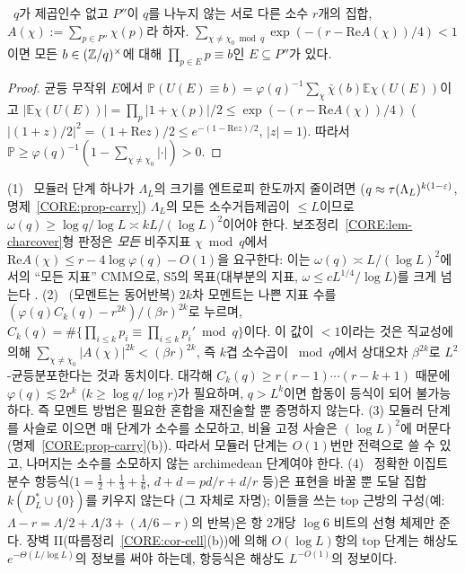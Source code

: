 \begin{lemma}\label{CORE:lem-charcover}
\PROVED\ $q$가 제곱인수 없고 $P''$이 $q$를 나누지 않는 서로 다른 소수 $r$개의 집합, $A(\chi):=\sum_{p\in P''}\chi(p)$라 하자. $\sum_{\chi\ne\chi_0\bmod q}\exp(-(r-\mathrm{Re}A(\chi))/4)<1$이면 모든 $b\in(\mathbb{Z}/q)^\times$에 대해 $\prod_{p\in E}p\equiv b$인 $E\subseteq P''$가 있다.
\end{lemma}
\begin{proof}
균등 무작위 $E$에서 $\mathbb P(U(E)\equiv b)=\varphi(q)^{-1}\sum_\chi\bar\chi(b)\mathbb E\chi(U(E))$이고 $|\mathbb E\chi(U(E))|=\prod_p|1+\chi(p)|/2\le\exp(-(r-\mathrm{Re}A(\chi))/4)$ ($|(1+z)/2|^2=(1+\mathrm{Re}z)/2\le e^{-(1-\mathrm{Re}z)/2}$, $|z|=1$). 따라서 $\mathbb P\ge\varphi(q)^{-1}(1-\sum_{\chi\ne\chi_0}|\cdot|)>0$.
\end{proof}

\begin{remark}[경로 a의 정확한 실패 지점]\label{CORE:rem-routea-fail}
(1) \PROVED\ 모듈러 단계 하나가 $\Lambda_L$의 크기를 엔트로피 한도까지 줄이려면 ($q\approx\tau(\Lambda_L)^{k(1-\varepsilon)}$, 명제~\ref{CORE:prop-carry}) $\Lambda_L$의 모든 소수거듭제곱이 $\le L$이므로 $\omega(q)\ge\log q/\log L\asymp kL/(\log L)^2$이어야 한다. 보조정리~\ref{CORE:lem-charcover}형 판정은 \emph{모든} 비주지표 $\chi\bmod q$에서 $\mathrm{Re}A(\chi)\le r-4\log\varphi(q)-O(1)$을 요구한다: 이는 $\omega(q)\asymp L/(\log L)^2$에서의 ``모든 지표'' CMM으로, S5의 목표(대부분의 지표, $\omega\le cL^{1/4}/\log L$)를 크게 넘는다 \OPEN.
(2) \PROVED\ (모멘트는 동어반복) $2k$차 모멘트는 나쁜 지표 수를 $(\varphi(q)C_k(q)-r^{2k})/(\beta r)^{2k}$로 누르며, $C_k(q)=\#\{\prod_{i\le k}p_i\equiv\prod_{i\le k}p_i'\bmod q\}$이다. 이 값이 $<1$이라는 것은 직교성에 의해 $\sum_{\chi\ne\chi_0}|A(\chi)|^{2k}<(\beta r)^{2k}$, 즉 $k$겹 소수곱이 $\bmod q$에서 상대오차 $\beta^{2k}$로 $L^2$-균등분포한다는 것과 동치이다. 대각해 $C_k(q)\ge r(r-1)\cdots(r-k+1)$ 때문에 $\varphi(q)\lesssim 2r^k$ ($k\ge\log q/\log r$)가 필요하며, $q>L^k$이면 합동이 등식이 되어 불가능하다. 즉 모멘트 방법은 필요한 혼합을 재진술할 뿐 증명하지 않는다.
(3)  모듈러 단계를 사슬로 이으면 매 단계가 소수를 소모하고, 비율 고정 사슬은 $(\log L)^2$에 머문다 (명제~\ref{CORE:prop-carry}(b)). 따라서 모듈러 단계는 $O(1)$번만 전력으로 쓸 수 있고, 나머지는 소수를 소모하지 않는 archimedean 단계여야 한다.
(4) \HEUR\ 정확한 이집트 분수 항등식($1=\frac12+\frac13+\frac16$, $d+d=pd/r+d/r$ 등)은 표현을 바꿀 뿐 도달 집합 $k(D^*_L\cup\{0\})$를 키우지 않는다 (그 자체로 자명); 이들을 쓰는 top 근방의 구성(예: $\Lambda-r=\Lambda/2+\Lambda/3+(\Lambda/6-r)$의 반복)은 항 2개당 $\log6$ 비트의 선형 체제만 준다. 장벽 II(따름정리~\ref{CORE:cor-cell}(b))에 의해 $O(\log L)$항의 top 단계는 해상도 $e^{-\Theta(L/\log L)}$의 정보를 써야 하는데, 항등식은 해상도 $L^{-O(1)}$의 정보이다.
\end{remark}

